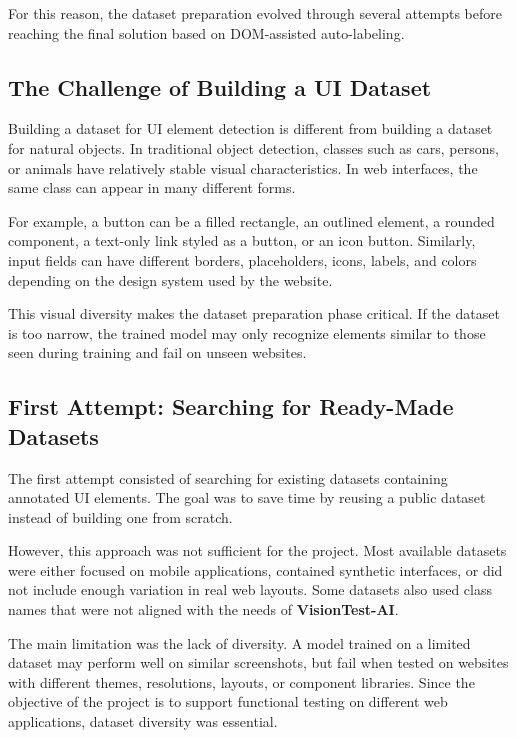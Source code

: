 For this reason, the dataset preparation evolved through several attempts before reaching the final solution based on DOM-assisted auto-labeling.

\subsection{The Challenge of Building a UI Dataset}
\label{subsec:dataset_challenge}

Building a dataset for UI element detection is different from building a dataset for natural objects. In traditional object detection, classes such as cars, persons, or animals have relatively stable visual characteristics. In web interfaces, the same class can appear in many different forms.

For example, a button can be a filled rectangle, an outlined element, a rounded component, a text-only link styled as a button, or an icon button. Similarly, input fields can have different borders, placeholders, icons, labels, and colors depending on the design system used by the website.

This visual diversity makes the dataset preparation phase critical. If the dataset is too narrow, the trained model may only recognize elements similar to those seen during training and fail on unseen websites.

\subsection{First Attempt: Searching for Ready-Made Datasets}
\label{subsec:ready_made_datasets}

The first attempt consisted of searching for existing datasets containing annotated UI elements. The goal was to save time by reusing a public dataset instead of building one from scratch.

However, this approach was not sufficient for the project. Most available datasets were either focused on mobile applications, contained synthetic interfaces, or did not include enough variation in real web layouts. Some datasets also used class names that were not aligned with the needs of \textbf{VisionTest-AI}.

The main limitation was the lack of diversity. A model trained on a limited dataset may perform well on similar screenshots, but fail when tested on websites with different themes, resolutions, layouts, or component libraries. Since the objective of the project is to support functional testing on different web applications, dataset diversity was essential.



